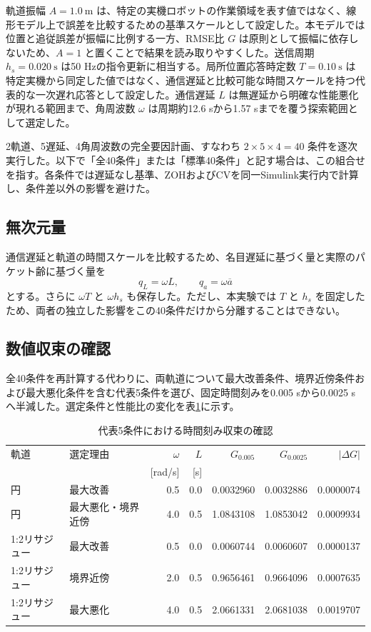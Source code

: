 \documentclass[11pt,a4paper]{article}
\begin{document}
軌道振幅 $A=1.0\ \mathrm{m}$ は、特定の実機ロボットの作業領域を表す値ではなく、線形モデル上で誤差を比較するための基準スケールとして設定した。本モデルでは位置と追従誤差が振幅に比例する一方、RMSE比 $G$ は原則として振幅に依存しないため、$A=1$ と置くことで結果を読み取りやすくした。送信周期 $h_s=0.020\ \mathrm{s}$ は50 Hzの指令更新に相当する。局所位置応答時定数 $T=0.10\ \mathrm{s}$ は特定実機から同定した値ではなく、通信遅延と比較可能な時間スケールを持つ代表的な一次遅れ応答として設定した。通信遅延 $L$ は無遅延から明確な性能悪化が現れる範囲まで、角周波数 $\omega$ は周期約12.6 sから1.57 sまでを覆う探索範囲として選定した。

2軌道、5遅延、4角周波数の完全要因計画、すなわち $2\times5\times4=40$ 条件を逐次実行した。以下で「全40条件」または「標準40条件」と記す場合は、この組合せを指す。各条件では遅延なし基準、ZOHおよびCVを同一Simulink実行内で計算し、条件差以外の影響を避けた。

\subsection{無次元量}

通信遅延と軌道の時間スケールを比較するため、名目遅延に基づく量と実際のパケット齢に基づく量を
\begin{equation}
 q_L=\omega L,
 \qquad
 q_a=\omega\overline a
\end{equation}
とする。さらに $\omega T$ と $\omega h_s$ も保存した。ただし、本実験では $T$ と $h_s$ を固定したため、両者の独立した影響をこの40条件だけから分離することはできない。

\subsection{数値収束の確認}

全40条件を再計算する代わりに、両軌道について最大改善条件、境界近傍条件および最大悪化条件を含む代表5条件を選び、固定時間刻みを0.005 sから0.0025 sへ半減した。選定条件と性能比の変化を表\ref{tab:convergence}に示す。

\begin{table}[H]
\centering
\caption{代表5条件における時間刻み収束の確認}
\label{tab:convergence}
\scriptsize
\setlength{\tabcolsep}{4.0pt}
\begin{tabular}{llrrrrr}
\toprule
軌道 & 選定理由 & $\omega$ & $L$ & $G_{0.005}$ & $G_{0.0025}$ & $|\Delta G|$ \\
 & & [rad/s] & [s] & & & \\
\midrule
円 & 最大改善 & 0.5 & 0.0 & 0.0032960 & 0.0032886 & 0.0000074 \\
円 & 最大悪化・境界近傍 & 4.0 & 0.5 & 1.0843108 & 1.0853042 & 0.0009934 \\
1:2リサジュー & 最大改善 & 0.5 & 0.0 & 0.0060744 & 0.0060607 & 0.0000137 \\
1:2リサジュー & 境界近傍 & 2.0 & 0.5 & 0.9656461 & 0.9664096 & 0.0007635 \\
1:2リサジュー & 最大悪化 & 4.0 & 0.5 & 2.0661331 & 2.0681038 & 0.0019707 \\
\bottomrule
\end{tabular}
\end{table}
\end{document}
